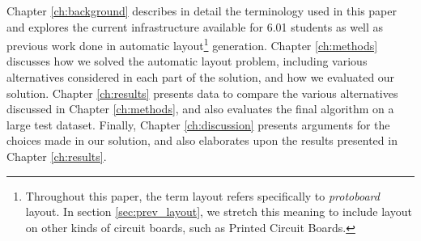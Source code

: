 Chapter \ref{ch:background} describes in detail the terminology
used in this paper and explores the current infrastructure available for
6.01 students as well as previous work done in automatic layout\footnote{
Throughout this paper, the term layout refers
specifically to \emph{protoboard} layout. In section \ref{sec:prev_layout}, we
stretch this meaning to include layout on other kinds of circuit boards,
such as Printed Circuit Boards.} generation.
Chapter \ref{ch:methods} discusses how we solved the automatic layout problem,
including various
alternatives considered in each part of the solution, and how we evaluated
our solution. Chapter \ref{ch:results} presents data to compare the various
alternatives discussed in Chapter \ref{ch:methods}, and also evaluates the final
algorithm on a large test dataset. Finally, Chapter \ref{ch:discussion}
presents arguments for the choices made in our solution, and
also elaborates upon the results presented in Chapter \ref{ch:results}.

%


